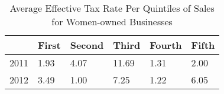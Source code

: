 \begin{table}[htbp]
\caption{\label{tab:tableA3} Average Effective Tax Rate Per Quintiles of Sales for Women-owned Businesses}\centering\medskip
\begin{tabular}{llllll} \hline \hline
 & First  & Second  & Third  & Fourth  & Fifth  \\  \hline 
2011 &      1.93 &      4.07 &     11.69 &      1.31 &      2.00 \\  
2012 &      3.49 &      1.00 &      7.25 &      1.22 &      6.05 \\  
\hline \hline \end{tabular}
\end{table}
